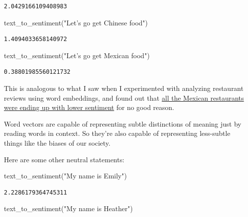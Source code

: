 \documentclass[]{book}
\newenvironment{Shaded}{\begin{snugshade}}{\end{snugshade}}
\newcommand{\StringTok}[1]{\textcolor[rgb]{0.31,0.60,0.02}{#1}}
\newcommand{\NormalTok}[1]{#1}
\theoremstyle{definition}
\theoremstyle{definition}
\theoremstyle{definition}
\theoremstyle{remark}
\begin{document}
\begin{verbatim}
2.0429166109408983
\end{verbatim}

\begin{Shaded}
\begin{Highlighting}[]
\NormalTok{text_to_sentiment(}\StringTok{"Let's go get Chinese food"}\NormalTok{)}
\end{Highlighting}
\end{Shaded}

\begin{verbatim}
1.4094033658140972
\end{verbatim}

\begin{Shaded}
\begin{Highlighting}[]
\NormalTok{text_to_sentiment(}\StringTok{"Let's go get Mexican food"}\NormalTok{)}
\end{Highlighting}
\end{Shaded}

\begin{verbatim}
0.38801985560121732
\end{verbatim}

This is analogous to what I saw when I experimented with analyzing
restaurant reviews using word embeddings, and found out that
\href{https://blog.conceptnet.io/2017/04/24/conceptnet-numberbatch-17-04-better-less-stereotyped-word-vectors/}{all
the Mexican restaurants were ending up with lower sentiment} for no good
reason.

Word vectors are capable of representing subtle distinctions of meaning
just by reading words in context. So they're also capable of
representing less-subtle things like the biases of our society.

Here are some other neutral statements:

\begin{Shaded}
\begin{Highlighting}[]
\NormalTok{text_to_sentiment(}\StringTok{"My name is Emily"}\NormalTok{)}
\end{Highlighting}
\end{Shaded}

\begin{verbatim}
2.2286179364745311
\end{verbatim}

\begin{Shaded}
\begin{Highlighting}[]
\NormalTok{text_to_sentiment(}\StringTok{"My name is Heather"}\NormalTok{)}
\end{Highlighting}
\end{Shaded}
\end{document}
